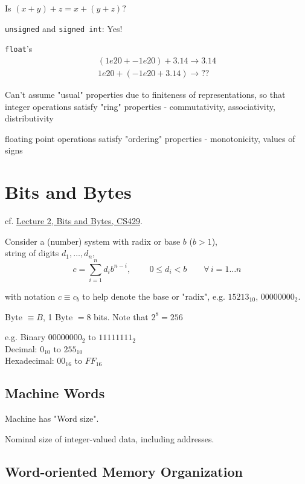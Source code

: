 \documentclass[10pt]{amsart}
\begin{document}
Is $(x+y) + z = x + (y +z)?$

\texttt{unsigned} and \texttt{signed int}: Yes!

\texttt{float}'s 
\[
\begin{gathered}
(1e20 + -1e20) + 3.14 \to 3.14 \\
1e20 + (-1e20 + 3.14) \to ??
\end{gathered}
\]

Can't assume "usual" properties due to finiteness of representations, so that integer operations satisfy "ring" properties
- commutativity, associativity, distributivity

floating point operations satisfy "ordering" properties
- monotonicity, values of signs


\section{Bits and Bytes}

cf. \href{https://www.cs.utexas.edu/users/fussell/courses/cs429h/lectures/Lecture_2-429h.pdf}{Lecture 2, Bits and Bytes, CS429}.

Consider a (number) system with radix or base $b$ ($b>1$), \\
string of digits $d_1, \dots , d_n$, \\
\begin{equation}
c = \sum_{i=1}^n d_i b^{n-i}, \qquad \, 0 \leq d_i < b \qquad \forall \, i = 1 \dots n 
\end{equation}

with notation $c \equiv c_b$ to help denote the base or "radix", e.g. $15213_{10}$, $00000000_2$.

Byte $\equiv B$, 1 Byte $ = 8$ bits. Note that $2^8 = 256$

e.g. Binary $00000000_2$ to $11111111_2$ \\
Decimal: $0_{10}$ to $255_{10}$ \\
Hexadecimal: $00_{16}$ to $FF_{16}$

\subsection{Machine Words}

Machine has "Word size".

Nominal size of integer-valued data, including addresses.

\subsection{Word-oriented Memory Organization}
\end{document}
